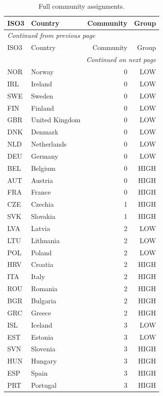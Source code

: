\documentclass[12pt,a4paper]{article}
\begin{document}
\begin{longtable}{@{}llrr@{}}
\caption{Full community assignments.}\label{tab:comm_full}\\
\toprule
ISO3 & Country & Community & Group \\
\midrule
\endfirsthead
\multicolumn{4}{l}{\small\textit{Continued from previous page}}\\
\toprule
ISO3 & Country & Community & Group \\
\midrule
\endhead
\midrule
\multicolumn{4}{r}{\small\textit{Continued on next page}}\\
\endfoot
\bottomrule
\endlastfoot
NOR & Norway          & 0 & LOW  \\
IRL & Ireland         & 0 & LOW  \\
SWE & Sweden          & 0 & LOW  \\
FIN & Finland         & 0 & LOW  \\
GBR & United Kingdom  & 0 & LOW  \\
DNK & Denmark         & 0 & LOW  \\
NLD & Netherlands     & 0 & LOW  \\
DEU & Germany         & 0 & LOW  \\
BEL & Belgium         & 0 & HIGH \\
AUT & Austria         & 0 & HIGH \\
FRA & France          & 0 & HIGH \\
\midrule
CZE & Czechia         & 1 & HIGH \\
SVK & Slovakia        & 1 & HIGH \\
\midrule
LVA & Latvia          & 2 & LOW  \\
LTU & Lithuania       & 2 & LOW  \\
POL & Poland          & 2 & LOW  \\
HRV & Croatia         & 2 & HIGH \\
ITA & Italy           & 2 & HIGH \\
ROU & Romania         & 2 & HIGH \\
BGR & Bulgaria        & 2 & HIGH \\
GRC & Greece          & 2 & HIGH \\
\midrule
ISL & Iceland         & 3 & LOW  \\
EST & Estonia         & 3 & LOW  \\
SVN & Slovenia        & 3 & HIGH \\
HUN & Hungary         & 3 & HIGH \\
ESP & Spain           & 3 & HIGH \\
PRT & Portugal        & 3 & HIGH \\
\end{longtable}
\end{document}
